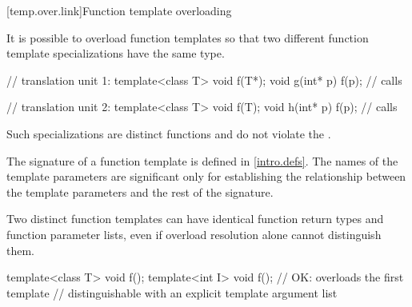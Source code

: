 [temp.over.link]{Function template overloading}

\pnum
{}%
It is possible to overload function templates so that two different
function template specializations have the same type.
\begin{example}

\begin{minipage}{.45\hsize}
\begin{codeblock}
// translation unit 1:
template<class T>
  void f(T*);
void g(int* p) {
  f(p); // calls 
}
\end{codeblock}
\end{minipage}
\begin{minipage}{.45\hsize}
\begin{codeblock}
// translation unit 2:
template<class T>
  void f(T);
void h(int* p) {
  f(p); // calls 
}
\end{codeblock}
\end{minipage}
\end{example}

\pnum
Such specializations are distinct functions and do not violate the
.

\pnum
The signature of a function template
is defined in \ref{intro.defs}.
The names of the template parameters are significant only for establishing
the relationship between the template parameters and the rest of the
signature.
\begin{note}
Two distinct function templates can have identical function return types and
function parameter lists, even if overload resolution alone cannot distinguish
them.

\begin{codeblock}
template<class T> void f();
template<int I> void f();       // OK: overloads the first template
                                // distinguishable with an explicit template argument list
\end{codeblock}
\end{note}

